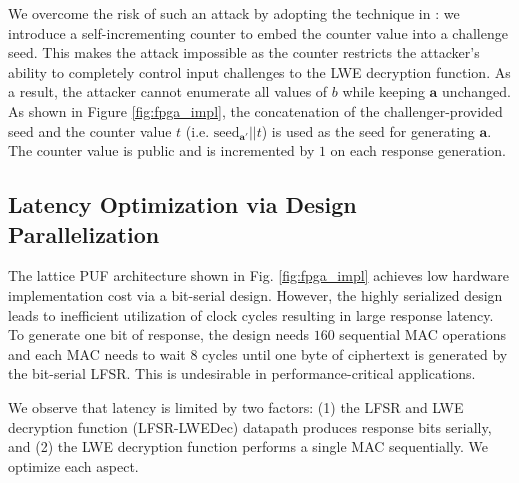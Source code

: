 We overcome the risk of such an attack by adopting the technique in \cite{yu2016lockdown}: we  introduce a self-incrementing counter to embed the counter value into a challenge seed. 
This makes the attack impossible as the counter restricts the attacker's ability to completely control input challenges to the LWE decryption function.
As a result, the attacker cannot enumerate all values of $b$ while keeping $\mathbf{a}$ unchanged. 
As shown in Figure \ref{fig:fpga_impl}, the concatenation of the challenger-provided seed and the counter value $t$ (i.e. $\text{seed}_{\mathbf{a}'}||t$) is used as the seed for generating $\mathbf{a}$. 
The counter value is public and is incremented by $1$ on each response generation.

\subsection{Latency Optimization via Design Parallelization}
\label{sec: lpuf_par}



The lattice PUF architecture shown in Fig. \ref{fig:fpga_impl} achieves low hardware implementation cost via a bit-serial design. %
However, the highly serialized design leads to inefficient utilization of clock cycles resulting in large response latency. To generate one bit of response, the design needs $160$ sequential MAC operations and each MAC needs to wait $8$ cycles until one byte of ciphertext is generated by the bit-serial LFSR. This is undesirable in performance-critical applications. %


We observe that latency is limited by two factors: (1) the LFSR and LWE decryption function (LFSR-LWEDec) datapath produces response bits serially, and (2) the LWE decryption function performs a single MAC sequentially.  We optimize each aspect. %

